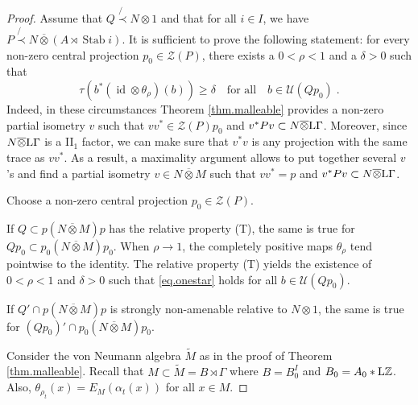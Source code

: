 \documentclass[a4paper,11pt]{amsart}
\numberwithin{equation}{section}
\begin{document}
\begin{proof}
Assume that $Q \not{\prec} N {\otimes} 1$ and that for all $i \in I$, we have $P \not{\prec} N {\mathbin{\overline{\otimes}}} (A \rtimes {\operatorname{Stab}} i)$. It is sufficient to prove the following statement: for every non-zero central projection $p_0 \in {\mathcal{Z}}(P)$, there exists a $0 < \rho < 1$ and a $\delta > 0$ such that
\begin{equation}\label{eq.onestar}
\tau(b^* ({\mathord{\operatorname{id}}} {\otimes} \theta_\rho)(b)) {\geqslant} \delta \quad\text{for all}\quad b \in {\mathcal{U}}(Qp_0) \; .
\end{equation}
Indeed, in these circumstances Theorem \ref{thm.malleable} provides a non-zero partial isometry $v$ such that $vv^* \in {\mathcal{Z}}(P) p_0$ and $v^* P v \subset N {\mathbin{\overline{\otimes}}} {\mathord{\text{\rm L}}} \Gamma$. Moreover, since $N {\mathbin{\overline{\otimes}}} {\mathord{\text{\rm L}}} \Gamma$ is a II$_1$ factor, we can make sure that $v^* v$ is any projection with the same trace as $vv^*$. As a result, a maximality argument allows to put together several $v$'s and find a partial isometry $v \in N {\mathbin{\overline{\otimes}}} M$ such that $vv^* = p$ and $v^* P v \subset N {\mathbin{\overline{\otimes}}} {\mathord{\text{\rm L}}} \Gamma$.

Choose a non-zero central projection $p_0 \in {\mathcal{Z}}(P)$.

If $Q \subset p(N {\mathbin{\overline{\otimes}}} M)p$ has the relative property (T), the same is true for $Q p_0 \subset p_0(N {\mathbin{\overline{\otimes}}} M)p_0$. When $\rho {\rightarrow} 1$, the completely positive maps $\theta_\rho$ tend pointwise to the identity. The relative property (T) yields the existence of $0 < \rho < 1$ and $\delta > 0$ such that \eqref{eq.onestar} holds for all $b \in {\mathcal{U}}(Qp_0)$.

If $Q' \cap p (N {\mathbin{\overline{\otimes}}} M)p$ is strongly non-amenable relative to $N {\otimes} 1$, the same is true for $(Qp_0)' \cap p_0(N {\mathbin{\overline{\otimes}}} M)p_0$.

Consider the von Neumann algebra ${\widetilde{M}}$ as in the proof of Theorem \ref{thm.malleable}. Recall that $M \subset {\widetilde{M}} = B \rtimes \Gamma$ where $B = B_0^I$ and $B_0 = A_0 * {\mathord{\text{\rm L}}} {\mathbb{Z}}$. Also, $\theta_{\rho_t}(x) = E_M({\alpha}_t(x))$ for all $x \in M$.


\end{proof}
\end{document}
